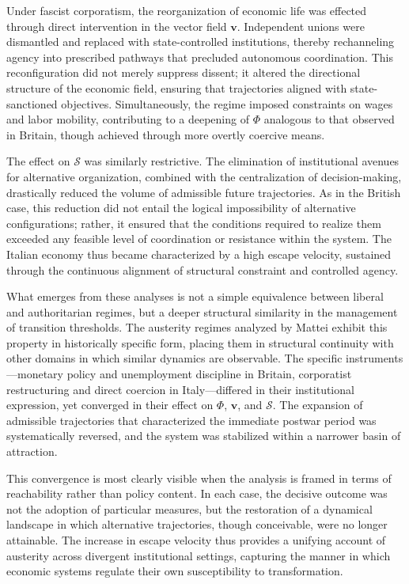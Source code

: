 \documentclass[11pt, a4paper]{article}
\begin{document}
Under fascist corporatism, the reorganization of economic life was effected through direct intervention in the vector field $\mathbf{v}$. Independent unions were dismantled and replaced with state-controlled institutions, thereby rechanneling agency into prescribed pathways that precluded autonomous coordination. This reconfiguration did not merely suppress dissent; it altered the directional structure of the economic field, ensuring that trajectories aligned with state-sanctioned objectives. Simultaneously, the regime imposed constraints on wages and labor mobility, contributing to a deepening of $\Phi$ analogous to that observed in Britain, though achieved through more overtly coercive means.

The effect on $\mathcal{S}$ was similarly restrictive. The elimination of institutional avenues for alternative organization, combined with the centralization of decision-making, drastically reduced the volume of admissible future trajectories. As in the British case, this reduction did not entail the logical impossibility of alternative configurations; rather, it ensured that the conditions required to realize them exceeded any feasible level of coordination or resistance within the system. The Italian economy thus became characterized by a high escape velocity, sustained through the continuous alignment of structural constraint and controlled agency.

What emerges from these analyses is not a simple equivalence between liberal and authoritarian regimes, but a deeper structural similarity in the management of transition thresholds. The austerity regimes analyzed by Mattei exhibit this property in historically specific form, placing them in structural continuity with other domains in which similar dynamics are observable. The specific instruments---monetary policy and unemployment discipline in Britain, corporatist restructuring and direct coercion in Italy---differed in their institutional expression, yet converged in their effect on $\Phi$, $\mathbf{v}$, and $\mathcal{S}$. The expansion of admissible trajectories that characterized the immediate postwar period was systematically reversed, and the system was stabilized within a narrower basin of attraction.

This convergence is most clearly visible when the analysis is framed in terms of reachability rather than policy content. In each case, the decisive outcome was not the adoption of particular measures, but the restoration of a dynamical landscape in which alternative trajectories, though conceivable, were no longer attainable. The increase in escape velocity thus provides a unifying account of austerity across divergent institutional settings, capturing the manner in which economic systems regulate their own susceptibility to transformation.
\end{document}
